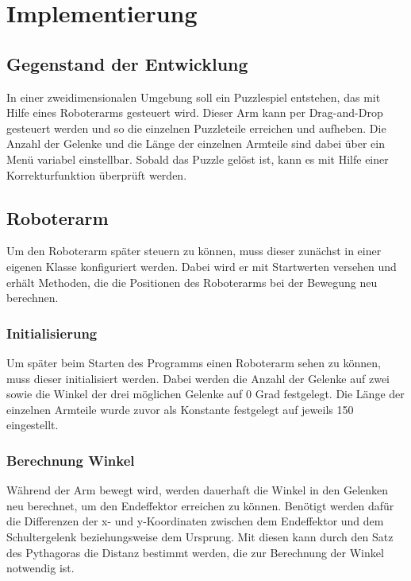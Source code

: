 \documentclass[12pt]{article}
\begin{document}
    \section{Implementierung}
        \subsection{Gegenstand der Entwicklung}
            In einer zweidimensionalen Umgebung soll ein Puzzlespiel entstehen, das mit Hilfe eines Roboterarms
            gesteuert wird. Dieser Arm kann per Drag-and-Drop gesteuert werden und so die einzelnen Puzzleteile
            erreichen und aufheben. Die Anzahl der Gelenke und die Länge der einzelnen Armteile sind dabei über
            ein Menü variabel einstellbar. Sobald das Puzzle gelöst ist, kann es mit Hilfe einer Korrekturfunktion
            überprüft werden.

        \subsection{Roboterarm}
            Um den Roboterarm später steuern zu können, muss dieser zunächst in einer eigenen Klasse konfiguriert
            werden. Dabei wird er mit Startwerten versehen und erhält Methoden, die die Positionen des Roboterarms
            bei der Bewegung neu berechnen.

            \subsubsection{Initialisierung}
                Um später beim Starten des Programms einen Roboterarm sehen zu können, muss dieser initialisiert
                werden. Dabei werden die Anzahl der Gelenke auf zwei sowie die Winkel der drei möglichen Gelenke
                auf 0 Grad festgelegt. Die Länge der einzelnen Armteile wurde zuvor als Konstante festgelegt auf
                jeweils 150 eingestellt.

            \subsubsection{Berechnung Winkel}
                Während der Arm bewegt wird, werden dauerhaft die Winkel in den Gelenken neu berechnet, um den
                Endeffektor erreichen zu können. Benötigt werden dafür die Differenzen der x- und y-Koordinaten
                zwischen dem Endeffektor und dem Schultergelenk beziehungsweise dem Ursprung. Mit diesen kann durch
                den Satz des Pythagoras die Distanz bestimmt werden, die zur Berechnung der Winkel notwendig ist.
\end{document}
